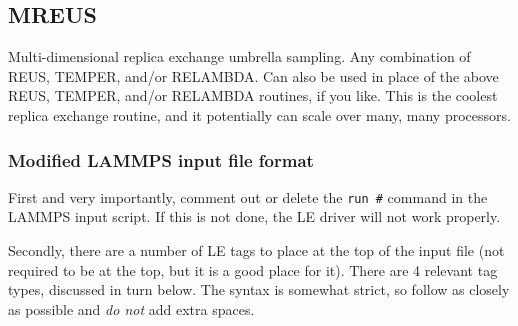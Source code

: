 \documentclass[10pt]{article}
\begin{document}
\subsection{MREUS}

Multi-dimensional replica exchange umbrella sampling. Any combination of REUS, TEMPER, and/or RELAMBDA. 
Can also be used in place of the above REUS, TEMPER, and/or RELAMBDA routines, if you like. This is the coolest
replica exchange routine, and it potentially can scale over many, many processors.

\subsubsection{Modified LAMMPS input file format}

First and very importantly, comment out
or delete the \texttt{run \#} command in the LAMMPS input script. If this is not done,
the LE driver will not work properly. 

Secondly, there are a number of LE tags to place
at the top of the input file (not required to be at the top, but it is a good place for it). 
There are 4 relevant tag types, discussed in turn below. The syntax is somewhat strict,
so follow as closely as possible and {\em do not} add extra spaces.
\end{document}

